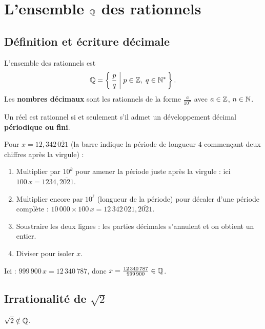 \section{L'ensemble $\mathbb{Q}$ des rationnels}

\subsection{Définition et écriture décimale}

\begin{defbox}
L'ensemble des rationnels est
\[
  \mathbb{Q} = \left\{\,\frac{p}{q}\;\middle|\; p \in \mathbb{Z},\; q \in \mathbb{N}^*\,\right\}.
\]
Les \textbf{nombres décimaux} sont les rationnels de la forme $\frac{a}{10^n}$ avec $a \in \mathbb{Z}$, $n \in \mathbb{N}$.
\end{defbox}

\begin{propbox}
Un réel est rationnel si et seulement s'il admet un développement décimal \textbf{périodique ou fini}.
\end{propbox}

\begin{methodbox}
Pour $x = 12{,}342\,\overline{021}$ (la barre indique la période de longueur $4$ commençant deux chiffres après la virgule) :
\begin{enumerate}[leftmargin=1.5cm]
  \item Multiplier par $10^k$ pour amener la période juste après la virgule : ici $100\,x = 1234{,}\overline{2021}$.
  \item Multiplier encore par $10^\ell$ (longueur de la période) pour décaler d'une période complète : $10\,000 \times 100\,x = 12\,342\,021{,}\overline{2021}$.
  \item Soustraire les deux lignes : les parties décimales s'annulent et on obtient un entier.
  \item Diviser pour isoler $x$.
\end{enumerate}
Ici : $999\,900\,x = 12\,340\,787$, donc $x = \frac{12\,340\,787}{999\,900} \in \mathbb{Q}$.
\end{methodbox}

\subsection{Irrationalité de $\sqrt{2}$}

\begin{thmbox}
$\sqrt{2} \notin \mathbb{Q}$.
\end{thmbox}


